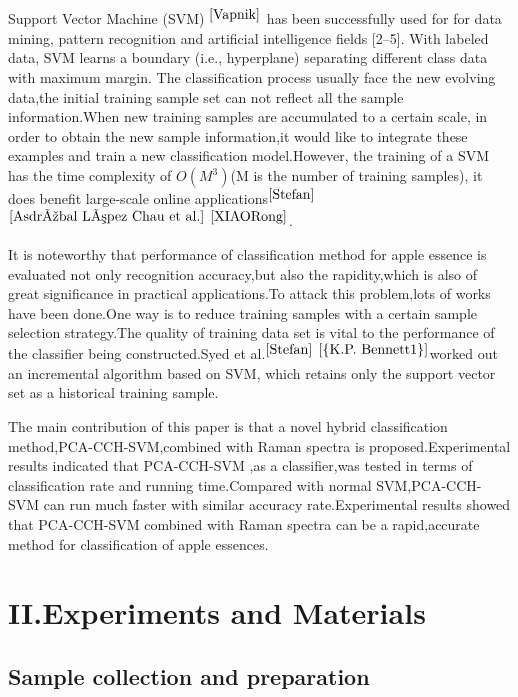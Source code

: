 \documentclass[a4paper]{article}
\begin{document}
Support Vector Machine (SVM) $^{\cite{Vapnik}}$ has been successfully used for for data mining, pattern recognition and artiﬁcial intelligence ﬁelds [2–5]. With labeled data, SVM learns a boundary (i.e., hyperplane) separating different class data with maximum margin.
The classification process usually face the new evolving data,the initial training sample set can not reflect all the sample information.When new training samples are accumulated to a certain scale, in order to obtain the new sample information,it would like to integrate these examples and train a new classification model.However, the training of a SVM has the time complexity of $O(M^3)$(M is the number of training samples), it does benefit large-scale online applications$^{\cite{Stefan}}$ $^{\cite{Asdrúbal López Chau et al.}}$ $^{\cite{XIAORong}}$.

It is noteworthy that performance of classification method for apple essence is evaluated not only recognition accuracy,but also the rapidity,which is also of great significance in practical applications.To attack this problem,lots of works have been done.One way is to reduce training samples with a certain sample selection strategy.The quality of training data set is vital to the performance of the classifier being constructed.Syed et al.$ ^{\cite{Stefan}}$ $ ^{\cite{{K.P. Bennett1}}}$worked out an incremental algorithm based on SVM, which retains only the support vector set as a historical training sample.

The main contribution of this paper is that a novel hybrid classification method,PCA-CCH-SVM,combined with Raman spectra is proposed.Experimental results indicated that PCA-CCH-SVM ,as a classifier,was tested in terms of classification rate and running time.Compared with normal SVM,PCA-CCH-SVM can run much faster with similar accuracy rate.Experimental results showed that PCA-CCH-SVM combined with Raman spectra can be a rapid,accurate  method for classification of apple essences.

\section{II.Experiments and Materials}
\subsection{Sample collection and preparation}
\end{document}
